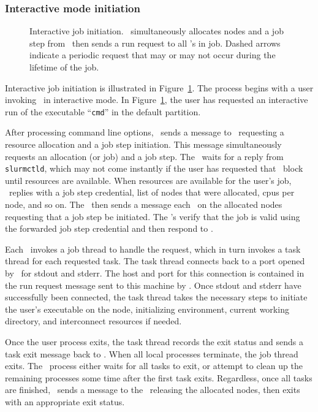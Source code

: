 \subsubsection{Interactive mode initiation}

\begin{figure}[tb]
\centerline{ }
\caption{\small Interactive job initiation. \srun\ simultaneously allocates
nodes
         and a job step from \slurmctld\ then sends a run request to all
         \slurmd 's in job. Dashed arrows indicate a periodic request that
         may or may not occur during the lifetime of the job.}
\label{init-interactive}
\end{figure}

Interactive job initiation is illustrated in Figure~\ref{init-interactive}.
The process begins with a user invoking \srun\ in interactive mode.
In Figure~\ref{init-interactive}, the user has requested an interactive
run of the executable ``{\tt cmd}'' in the default partition.

After processing command line options, \srun\ sends a message to
\slurmctld\ requesting a resource allocation and a job step initiation.
This message simultaneously requests an allocation (or job) and a job step.
The \srun\ waits for a reply from {\tt slurmctld}, which may not come instantly
if the user has requested that \srun\ block until resources are available.
When resources are available
for the user's job, \slurmctld\ replies with a job step credential, list of
nodes that were allocated, cpus per node, and so on. The \srun\ then sends
a message each \slurmd\ on the allocated nodes requesting that a job
step be initiated. The \slurmd 's verify that the job is valid using
the forwarded job step credential and then respond to \srun .

Each \slurmd\ invokes a job thread to handle the request, which in turn
invokes a task thread for each requested task. The task thread connects
back to a port opened by \srun\ for stdout and stderr. The host and
port for this connection is contained in the run request message sent
to this machine by \srun . Once stdout and stderr have successfully
been connected, the task thread takes the necessary steps to initiate
the user's executable on the node, initializing environment, current
working directory, and interconnect resources if needed.

Once the user process exits, the task thread records the exit status and
sends a task exit message back to \srun . When all local processes
terminate, the job thread exits. The \srun\ process either waits
for all tasks to exit, or attempt to clean up the remaining processes
some time after the first task exits.
Regardless, once all
tasks are finished, \srun\ sends a message to the \slurmctld\ releasing
the allocated nodes, then exits with an appropriate exit status.

